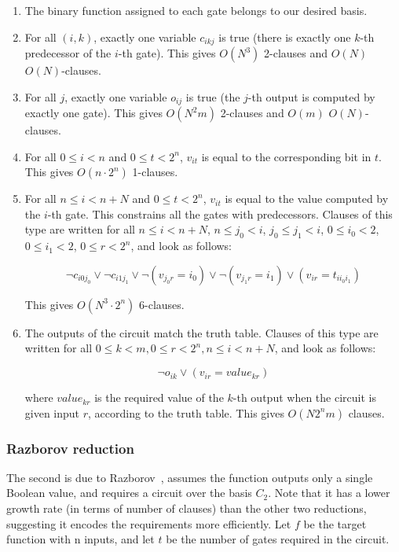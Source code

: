 \documentclass{article}
\begin{document}
\begin{enumerate}

  \item The binary function assigned to each gate belongs to our desired basis.
  \item For all $(i,k)$, exactly one variable $c_{ikj}$ is true (there is exactly one $k$-th predecessor of the $i$-th gate). This gives $O(N^3)$ 2-clauses and $O(N)$ $O(N)$-clauses.
  \item For all $j$, exactly one variable $o_{ij}$ is true (the $j$-th output is computed by exactly one gate). This gives $O(N^2m)$ 2-clauses and $O(m)$ $O(N)$-clauses.
  \item For all $0 \leq i < n$ and $0 \leq t < 2^n$, $v_{it}$ is equal to the corresponding bit in $t$. This gives $O(n \cdot 2^n)$ 1-clauses.
  \item For all $n \leq i < n + N$ and $0 \leq t < 2^n$, $v_{it}$ is equal to the value computed by the $i$-th gate. This constrains all the gates with predecessors. Clauses of this type are written for all $n \leq i < n + N$, $n \leq j_0 < i$, $j_0 \leq j_1 < i$, $0 \leq i_0 < 2$, $0 \leq i_1 < 2$, $0 \leq r < 2^n$, and look as follows: 

  \[
    \neg c_{i0j_0} \lor \neg c_{i1j_1} \lor \neg(v_{j_0r} = i_0) \lor \neg(v_{j_1r} = i_1) \lor (v_{ir} = t_{ii_0i_1})
  \]

  This gives $O(N^3 \cdot 2^n)$ 6-clauses.
  \item The outputs of the circuit match the truth table. Clauses of this type are written for all $0 \leq k < m, 0 \leq r < 2^n, n \leq i < n + N$, and look as follows:
 
  \[
    \neg o_{ik} \lor (v_{ir} = value_{kr})
  \] 

  where $value_{kr}$ is the required value of the $k$-th output when the circuit is given input $r$, according to the truth table. This gives $O(N2^nm)$ clauses.

\end{enumerate}


\subsubsection{Razborov reduction}

The second is due to Razborov~\cite{raz}, assumes the function outputs only a single Boolean value, and requires a circuit over the basis \(C_2\). Note that it has a lower growth rate (in terms of number of clauses) than the other two reductions, suggesting it encodes the requirements more efficiently. Let $f$ be the target function with n inputs, and let $t$ be the number of gates required in the circuit.
\end{document}
